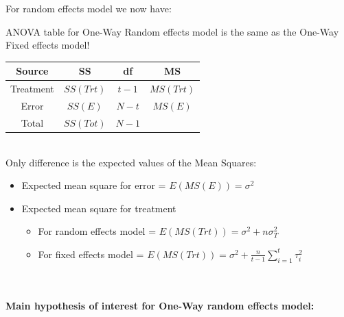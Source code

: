 For random effects model we now have:

\newpage

ANOVA table for One-Way Random effects model is the same as the One-Way Fixed effects model!
\begin{center}
\begin{tabular}{cccc}
Source & SS & df & MS  \\ \hline
Treatment & $SS(Trt)$ & $t-1$ & $MS(Trt)$  \\
Error & $SS(E)$ & $N-t$ & $MS(E)$  \\
Total & $SS(Tot)$ & $N-1$ & \\ \hline
\end{tabular}
\end{center}
~\\
Only difference is the expected values of the Mean Squares:
\begin{itemize}
\item Expected mean square for error = $E(MS(E))=\sigma^2$
\item Expected mean square for treatment 
\begin{itemize}
\item For random effects model = $E(MS(Trt))=\sigma^2+n\sigma^2_T$\\
\item For fixed effects model = $E(MS(Trt))=\sigma^2+\frac{n}{t-1}\sum_{i=1}^{t}\tau_i^2$\\~\\~\\
\end{itemize}
\end{itemize}


\textbf{Main hypothesis of interest for One-Way random effects model:}

\newpage

